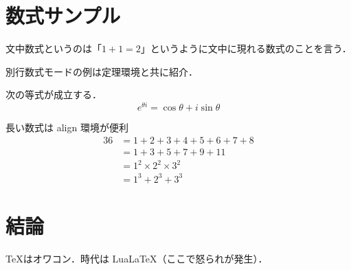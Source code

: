 \documentclass[lualatex,paper=b5,jafontsize=12pt]{jlreq}
\begin{document}
\section{数式サンプル}

文中数式というのは「$1+1=2$」というように文中に現れる数式のことを言う．

別行数式モードの例は定理環境と共に紹介．

\begin{theorem}[オイラーの公式]
次の等式が成立する．
\[
 e^{\theta i}=\cos \theta + i\sin \theta
\]
\end{theorem}

長い数式は align 環境が便利
\begin{align*}
 36 &= 1 + 2 + 3 + 4 + 5 + 6 + 7 + 8 \\
 &= 1 + 3 + 5 + 7 + 9 + 11 \\ 
 &= 1^{2}\times 2^{2} \times 3^{2}\\
 &= 1^{3} + 2^{3} + 3^{3}
\end{align*}

\section{結論}
\TeX はオワコン．時代は Lua\LaTeX（ここで怒られが発生）．
\end{document}
